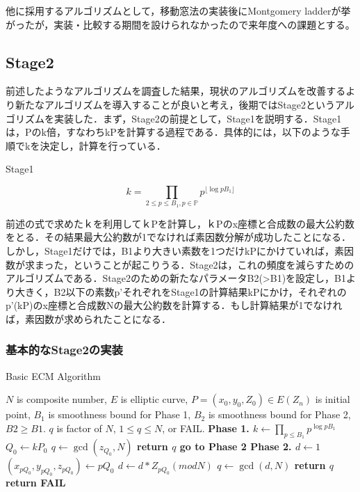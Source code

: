 \documentclass[openany,11pt,papersize]{jsbook}
\begin{document}
他に採用するアルゴリズムとして，移動窓法の実装後にMontgomery ladderが挙がったが，実装・比較する期間を設けられなかったので来年度への課題とする。

\subsection{Stage2}
前述したようなアルゴリズムを調査した結果，現状のアルゴリズムを改善するより新たなアルゴリズムを導入することが良いと考え，後期ではStage2というアルゴリズムを実装した．まず，Stage2の前提として，Stage1を説明する．Stage1は，Pのk倍，すなわちkPを計算する過程である．具体的には，以下のような手順でkを決定し，計算を行っている．

\begin{itembox}[l]{Stage1}
\begin{center}
\[
k = \prod_{2 \leq p \leq B_1, p \in \mathbb{P}} p^{\lfloor \log{p} B_1 \rfloor}
\]
\end{center}
\end{itembox}

前述の式で求めたｋを利用してｋPを計算し，ｋPのx座標と合成数の最大公約数をとる．その結果最大公約数が1でなければ素因数分解が成功したことになる．しかし，Stage1だけでは，B1より大きい素数を1つだけkPにかけていれば，素因数が求まった，ということが起こりうる．Stage2は，これの頻度を減らすためのアルゴリズムである．Stage2のための新たなパラメータB2(>B1)を設定し，B1より大きく，B2以下の素数p’それぞれをStage1の計算結果kPにかけ，それぞれのp’(kP)のx座標と合成数Nの最大公約数を計算する．もし計算結果が1でなければ，素因数が求められたことになる．

\subsubsection*{基本的なStage2の実装}

\begin{algorithm}[H]                   
\caption{Basic ECM Algorithm}
\label{alg:B}                          
\begin{algorithmic}                  
\REQUIRE $N$ is composite number, $E$ is elliptic curve, $P = (x_0, y_0, Z_0) \in E(Z_n)$ is initial point, $B_1$ is smoothness bound for Phase 1, $B_2$ is smoothness bound for Phase 2, $B2 \ge B1.$
\ENSURE $q$ is factor of $N$, $1 \le q \leq N$, or FAIL.
\STATE \bfseries{Phase 1.}
\STATE $k \gets \prod_{p \leq B_1} p^{\log{p} B_1}$
\STATE $Q_0 \gets kP_0$
\STATE $q \gets \gcd(z_{Q_0},N)$
\STATE return $q$
\ELSE
\STATE go to Phase 2
\ENDIF
\STATE \bfseries{Phase 2.}
\STATE $d \gets 1$
\STATE $(x_{pQ_0},y_{pQ_0},z_{pQ_0}) \gets pQ_0$
\STATE $d \gets d*Z_{pQ_0} (mod N)$
\ENDFOR
\STATE $q \gets \gcd(d,N)$
\STATE return $q$
\ELSE
\STATE return FAIL
\ENDIF
\end{algorithmic}
\end{algorithm}
\end{document}
